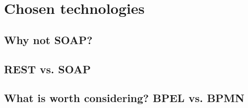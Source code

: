 \chapter{Chosen technologies}\label{technologies}

\section{Why not SOAP?}
	
\section{REST vs. SOAP}

\section{What is worth considering? BPEL vs. BPMN}